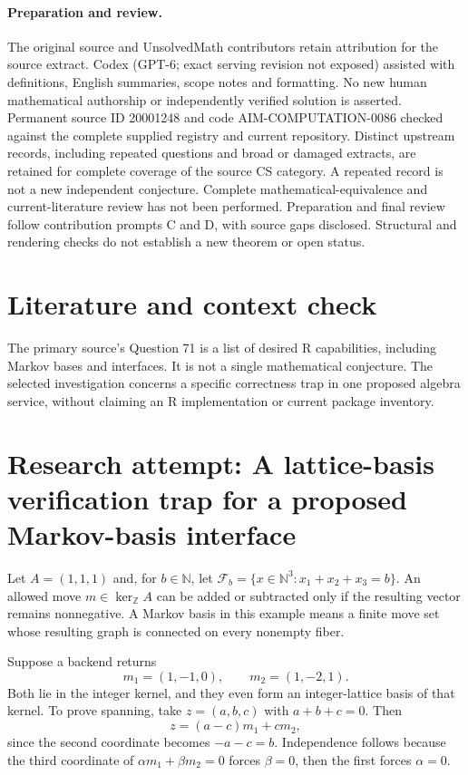\documentclass[11pt]{article}
\begin{document}
\paragraph{Preparation and review.}
The original source and UnsolvedMath contributors retain attribution for the source extract. Codex (GPT-6; exact serving revision not exposed) assisted with definitions, English summaries, scope notes and formatting. No new human mathematical authorship or independently verified solution is asserted. Permanent source ID 20001248 and code AIM-COMPUTATION-0086 checked against the complete supplied registry and current repository. Distinct upstream records, including repeated questions and broad or damaged extracts, are retained for complete coverage of the source CS category. A repeated record is not a new independent conjecture. Complete mathematical-equivalence and current-literature review has not been performed. Preparation and final review follow contribution prompts C and D, with source gaps disclosed. Structural and rendering checks do not establish a new theorem or open status.
\label{end:20001248}

\section{Literature and context check}
The primary source's Question 71 is a list of desired R capabilities, including Markov bases and interfaces. It is not a single mathematical conjecture. The selected investigation concerns a specific correctness trap in one proposed algebra service, without claiming an R implementation or current package inventory.
\section{Research attempt: A lattice-basis verification trap for a proposed Markov-basis interface}
Let $A=(1,1,1)$ and, for $b\in\mathbb N$, let $\mathcal F_b=\{x\in\mathbb N^3:x_1+x_2+x_3=b\}$. An allowed move $m\in\ker_{\mathbb Z}A$ can be added or subtracted only if the resulting vector remains nonnegative. A Markov basis in this example means a finite move set whose resulting graph is connected on every nonempty fiber.

Suppose a backend returns
\[
m_1=(1,-1,0),\qquad m_2=(1,-2,1).
\]
Both lie in the integer kernel, and they even form an integer-lattice basis of that kernel. To prove spanning, take $z=(a,b,c)$ with $a+b+c=0$. Then
\[
z=(a-c)m_1+c m_2,
\]
since the second coordinate becomes $-a-c=b$. Independence follows because the third coordinate of $\alpha m_1+\beta m_2=0$ forces $\beta=0$, then the first forces $\alpha=0$.
\end{document}
